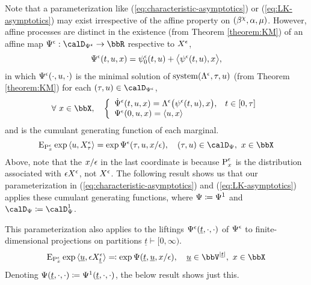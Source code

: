 Note that a parameterization like (\ref{eq:characteristic-asymptotics}) or (\ref{eq:LK-asymptotics}) may exist irrespective of the affine property on $(\beta^\chi, \alpha, \mu)$.
However, affine processes are distinct in the existence (from Theorem \ref{theorem:KM}) of an affine map $\aff^\epsilon: \momentSpacee \rightarrow \bbR$ respective to $X^\epsilon$,
\begin{equation*}
  \Psi^\epsilon(t, u, x) = \psi^\epsilon_0(t,u) + {\big\langle \psi^\epsilon(t,u) , x \big\rangle},
\end{equation*}
in which $\Psi^\epsilon(\cdot, u, \cdot)$ is the minimal solution of $\operatorname{system}(\Lambda^\epsilon, \tau, u)$ (from Theorem \ref{theorem:KM}) for each $(\tau, \momentVar) \in \momentSpacee$,
\begin{equation*}
  \forall~ \stateVar \in \stateSpace, \quad \left\{\begin{array}{ll}
    \displaystyle \dot\aff^\epsilon(t, \momentVar, \stateVar) = \ode^\epsilon\big( \affPart^\epsilon(t, \momentVar), \stateVar \big), & t \in [0,\tau] \\
    \aff^\epsilon(0, \momentVar, \stateVar) = \prj{\momentVar}{\stateVar}
  \end{array}\right.
\end{equation*}
and is the cumulant generating function of each marginal.
\begin{equation*}
  \Exp_{\Prb^\epsilon_\stateVar} \exp\prj{\momentVar}{\Xee_\tau} = \exp\aff^\epsilon(\tau, \momentVar, \stateVar/\epsilon), \quad (\tau, \momentVar) \in \momentSpace, ~ \stateVar \in \stateSpace
\end{equation*}
Above, note that the $x/\epsilon$ in the last coordinate is because ${\operatorname{P}}^\epsilon_x$ is the distribution associated with $\epsilon X^\epsilon$, not $X^\epsilon$.
The following result shows us that our parameterization in (\ref{eq:characteristic-asymptotics}) and (\ref{eq:LK-asymptotics}) applies these cumulant generating functions, where $\Psi \coloneqq \Psi^1$ and $\momentSpace \defeq \momentSpace^1$.




This parameterization also applies to the liftings $\Psi^\epsilon(\underline t, \cdot, \cdot)$ of $\Psi^\epsilon$ to finite-dimensional projections on partitions $\underline t \vdash [0,\infty)$.
\begin{equation*}
  \Exp_{\Prb^\epsilon_\stateVar}\exp\prj{\underline\momentVar}{\Xe_{\underline t}} \eqdef \exp\aff(\underline t, \underline\momentVar, \stateVar/\epsilon), \quad \underline\momentVar \in \vecSpace^{|\underline t|}, ~ \stateVar\in \stateSpace
\end{equation*}
Denoting $\Psi(\underline t, \cdot, \cdot) \coloneqq \Psi^1(\underline t, \cdot, \cdot)$, the below result shows just this.

